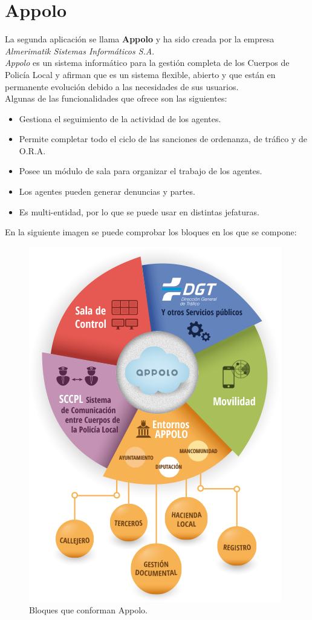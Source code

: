 \section{Appolo}
La segunda aplicación se llama \textbf{Appolo} y ha sido creada por la empresa \textit{Almerimatik Sistemas Informáticos S.A}. \\

\textit{Appolo} es un sistema informático para la gestión completa de los Cuerpos de Policía Local y afirman que es un sistema
flexible, abierto y que están en permanente evolución debido a las necesidades de sus usuarios.\\

Algunas de las funcionalidades que ofrece son las siguientes:
\begin{itemize}
	\item Gestiona el seguimiento de la actividad de los agentes.
	\item Permite completar todo el ciclo de las sanciones de ordenanza, de tráfico y de O.R.A. 
	\item Posee un módulo de sala para organizar el trabajo de los agentes.
	\item Los agentes pueden generar denuncias y partes.
	\item Es multi-entidad, por lo que se puede usar en distintas jefaturas.
\end{itemize}

En la siguiente imagen se puede comprobar los bloques en los que se compone:

\begin{figure}[H]
	\centering
	\includegraphics[scale=0.55]{imagenes/appolo-info.png}
	\caption{Bloques que conforman Appolo. \label{fig:figura15}}
\end{figure}

